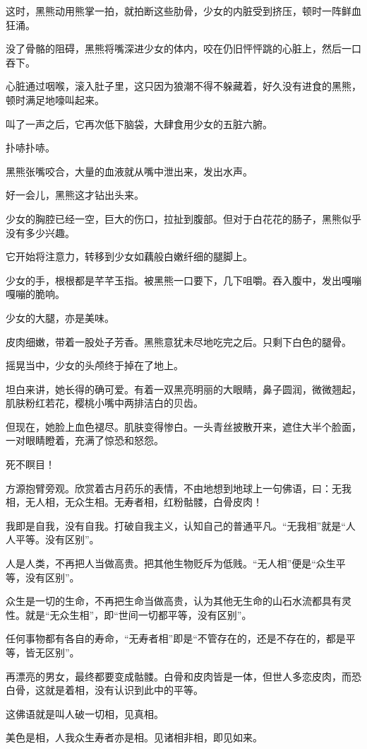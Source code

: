 \begin{this_body}
这时，黑熊动用熊掌一拍，就拍断这些肋骨，少女的内脏受到挤压，顿时一阵鲜血狂涌。

没了骨骼的阻碍，黑熊将嘴深进少女的体内，咬在仍旧怦怦跳的心脏上，然后一口吞下。

心脏通过咽喉，滚入肚子里，这只因为狼潮不得不躲藏着，好久没有进食的黑熊，顿时满足地嚎叫起来。

叫了一声之后，它再次低下脑袋，大肆食用少女的五脏六腑。

扑哧扑哧。

黑熊张嘴咬合，大量的血液就从嘴中泄出来，发出水声。

好一会儿，黑熊这才钻出头来。

少女的胸腔已经一空，巨大的伤口，拉扯到腹部。但对于白花花的肠子，黑熊似乎没有多少兴趣。

它开始将注意力，转移到少女如藕般白嫩纤细的腿脚上。

少女的手，根根都是芊芊玉指。被黑熊一口要下，几下咀嚼。吞入腹中，发出嘎嘣嘎嘣的脆响。

少女的大腿，亦是美味。

皮肉细嫩，带着一股处子芳香。黑熊意犹未尽地吃完之后。只剩下白色的腿骨。

摇晃当中，少女的头颅终于掉在了地上。

坦白来讲，她长得的确可爱。有着一双黑亮明丽的大眼睛，鼻子圆润，微微翘起，肌肤粉红若花，樱桃小嘴中两排洁白的贝齿。

但现在，她脸上血色褪尽。肌肤变得惨白。一头青丝披散开来，遮住大半个脸面，一对眼睛瞪着，充满了惊恐和怒怨。

死不瞑目！

方源抱臂旁观。欣赏着古月药乐的表情，不由地想到地球上一句佛语，曰：无我相，无人相，无众生相。无寿者相，红粉骷髅，白骨皮肉！

我即是自我，没有自我。打破自我主义，认知自己的普通平凡。“无我相”就是“人人平等。没有区别”。

人是人类，不再把人当做高贵。把其他生物贬斥为低贱。“无人相”便是“众生平等，没有区别”。

众生是一切的生命，不再把生命当做高贵，认为其他无生命的山石水流都具有灵性。就是“无众生相”，即“世间一切都平等，没有区别”。

任何事物都有各自的寿命，“无寿者相”即是“不管存在的，还是不存在的，都是平等，皆无区别”。

再漂亮的男女，最终都要变成骷髅。白骨和皮肉皆是一体，但世人多恋皮肉，而恐白骨，这就是着相，没有认识到此中的平等。

这佛语就是叫人破一切相，见真相。

美色是相，人我众生寿者亦是相。见诸相非相，即见如来。


\end{this_body}

